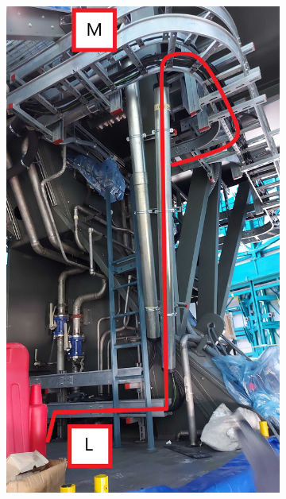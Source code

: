 \newpage

  \begin{figure}
    \centering
    \begin{subfigure}{0.40\textwidth}
      \centering
      \includegraphics[width=\textwidth]{images/27.jpg}
    \end{subfigure}
    \hfill
    \begin{subfigure}{0.40\textwidth}
      \centering

\end{subfigure}
\end{figure}
